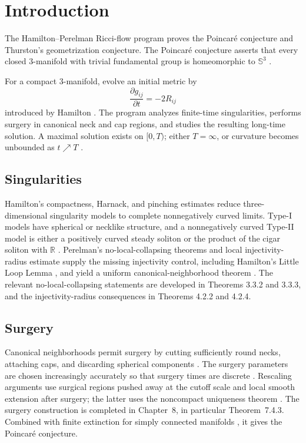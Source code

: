 \chapter{Introduction}
\label{chap:cz-introduction}

The Hamilton--Perelman Ricci-flow program proves the Poincar\'e
conjecture and Thurston's geometrization conjecture.  The Poincar\'e
conjecture asserts that every closed $3$-manifold with trivial
fundamental group is homeomorphic to $\mathbb S^3$ \cite{Th82}.

For a compact $3$-manifold, evolve an initial metric by
\[
\frac{\partial g_{ij}}{\partial t}=-2R_{ij}
\]
introduced by Hamilton \cite{Ha82}.  The program analyzes finite-time
singularities, performs surgery in
canonical neck and cap regions, and studies the resulting long-time
solution.  A maximal solution exists on $[0,T)$; either $T=\infty$,
or curvature becomes unbounded as $t\nearrow T$ \cite{Ha82}.

\section{Singularities}

Hamilton's compactness, Harnack, and pinching estimates reduce
three-dimensional singularity models to complete nonnegatively curved
limits.  Type-I models have spherical or necklike structure, and a
nonnegatively curved Type-II model is either a positively curved steady
soliton or the product of the cigar soliton with $\mathbb R$
\cite{Ha93, Ha93E, Ha95, Ha95F, Iv}.  Perelman's no-local-collapsing
theorems and local injectivity-radius estimate supply the missing
injectivity control, including Hamilton's Little Loop Lemma
\cite{Ha95F, CCCY}, and yield a uniform canonical-neighborhood theorem
\cite{P1}.  The relevant no-local-collapsing statements are developed
in Theorems 3.3.2 and 3.3.3, and the injectivity-radius consequences in
Theorems 4.2.2 and 4.2.4.

\section{Surgery}

Canonical neighborhoods permit surgery by cutting sufficiently round
necks, attaching caps, and discarding spherical components \cite{Ha97}.
The surgery
parameters are chosen increasingly accurately so that surgery times are
discrete \cite{P2}.  Rescaling arguments use surgical regions pushed away at the
cutoff scale and local smooth extension after surgery; the latter uses
the noncompact uniqueness theorem \cite{P2, CZ05F, CZ05U}.  The
surgery construction is completed in Chapter~8, in particular
Theorem~7.4.3.  Combined with finite extinction for simply connected
manifolds \cite{P3, CM}, it gives the Poincar\'e conjecture.

